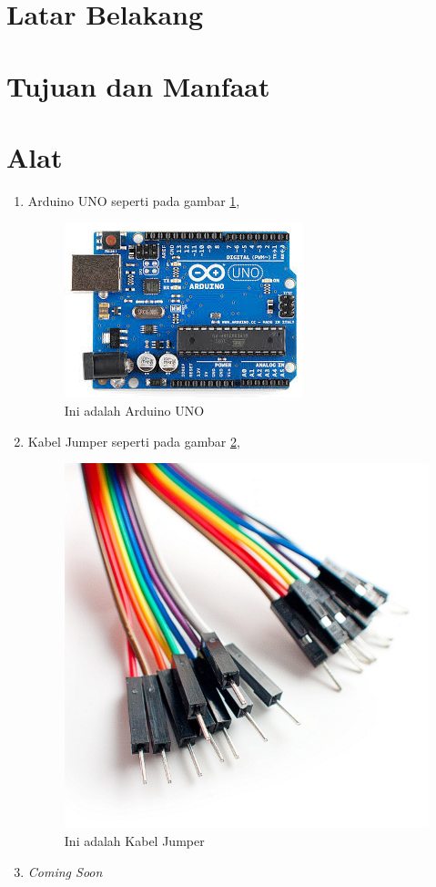 \section{Latar Belakang}

\section{Tujuan dan Manfaat}

\section{Alat}
\begin{enumerate}
  \item Arduino UNO seperti pada gambar \ref{fig:arduinouno},
  \begin{figure}[!htbp]
  \centering
  \includegraphics[width=.75\textwidth]{figures/Arduino/arduinouno.jpg}
  \caption{Ini adalah Arduino UNO}\label{fig:arduinouno}
\end{figure}
  \item Kabel Jumper seperti pada gambar \ref{fig:jumper},
  \begin{figure}[!htbp]
  \centering
  \includegraphics[width=.75\textwidth]{figures/Arduino/jumper.jpg}
  \caption{Ini adalah Kabel Jumper}\label{fig:jumper}
\end{figure}
  \item \textit{Coming Soon}
\end{enumerate}

